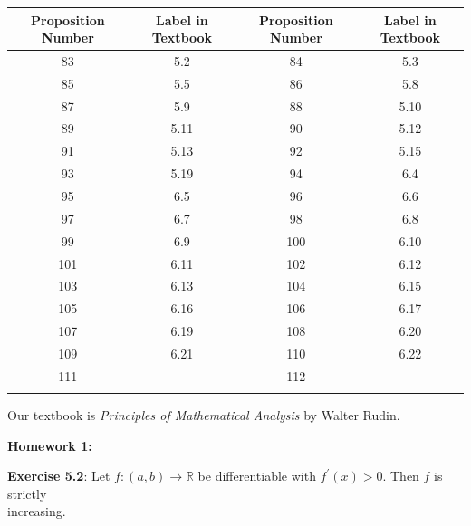 \documentclass{book}
\newenvironment{allowTableDashes}{\ADLactivate}{\ADLinactivate}
\newcommand{\pracOne}{
   \color{BrickRed}%
   \fontsize{13}{15}\selectfont%
}
\newcommand*{\markHW}[1]{%
   {\huge \color{Black} \textbf{#1} \newline}%
}
\newcommand{\retTwo}{\hfill\bigbreak}
\newcommand{\myVS}{\vphantom{$\int_a^b$}}
\begin{document}
\begin{allowTableDashes}
   \begin{tabular}{ c|c||c|c }
      Proposition Number & Label in Textbook & Proposition Number & Label in Textbook \\ \hline
      
      \myVS 83 & 5.2 & 84 & 5.3 \\ \hdashline[10pt/3pt]
      \myVS 85 & 5.5 & 86 & 5.8 \\ \hdashline[10pt/3pt]
      \myVS 87 & 5.9  & 88 & 5.10 \\ \hdashline[10pt/3pt]
      \myVS 89 & 5.11 & 90 & 5.12 \\ \hdashline[10pt/3pt]
      \myVS 91 & 5.13 & 92 & 5.15 \\ \hdashline[10pt/3pt]
      \myVS 93 & 5.19 & 94 & 6.4  \\ \hdashline[10pt/3pt]
      \myVS 95 & 6.5 & 96 & 6.6 \\ \hdashline[10pt/3pt]
      \myVS 97 & 6.7 & 98 & 6.8 \\ \hdashline[10pt/3pt]
      \myVS 99 & 6.9 & 100 & 6.10 \\ \hdashline[10pt/3pt]
      \myVS 101 & 6.11 & 102 & 6.12 \\ \hdashline[10pt/3pt]
      \myVS 103 & 6.13 & 104 & 6.15 \\ \hdashline[10pt/3pt]
      \myVS 105 & 6.16 & 106 & 6.17 \\ \hdashline[10pt/3pt]
      \myVS 107 & 6.19 & 108 & 6.20 \\ \hdashline[10pt/3pt]
      \myVS 109 & 6.21 & 110 & 6.22 \\ \hdashline[10pt/3pt]
      \myVS 111 &  & 112 &  \\ \hdashline[10pt/3pt]
   \end{tabular}

\end{allowTableDashes}

\retTwo

Our textbook is \textit{Principles of Mathematical Analysis} by Walter Rudin.
















\newpage
\pracOne

\markHW{Homework 1:}

\textbf{Exercise 5.2}: Let $f: (a, b) \longrightarrow \mathbb{R}$ be differentiable with $f^\prime(x) > 0$. Then $f$ is strictly\\ increasing.
\end{document}
